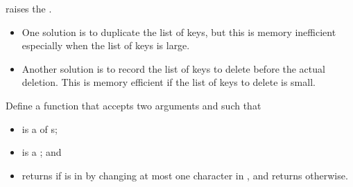 \documentclass[letterpaper,10pt,english]{sphinxmanual}
\begin{document}
\begin{sphinxVerbatim}[commandchars=\\\{\}]
        
         \PYG{p}{[}\PYG{p}{]}    \PYG{p}{[}\PYG{p}{]}
\end{sphinxVerbatim}

raises the .
\begin{itemize}
\item {} 
One solution is to duplicate the list of keys, but this is memory inefficient especially when the list of keys is large.

\item {} 
Another solution is to record the list of keys to delete before the actual deletion. This is memory efficient if the list of keys to delete is small.

\end{itemize}

 Define a function  that accepts two arguments  and  such that
\begin{itemize}
\item {} 
 is a  of s;

\item {} 
 is a ; and

\item {} 
 returns  if  is in  by changing at most one character in , and returns  otherwise.

\end{itemize}
\end{document}
